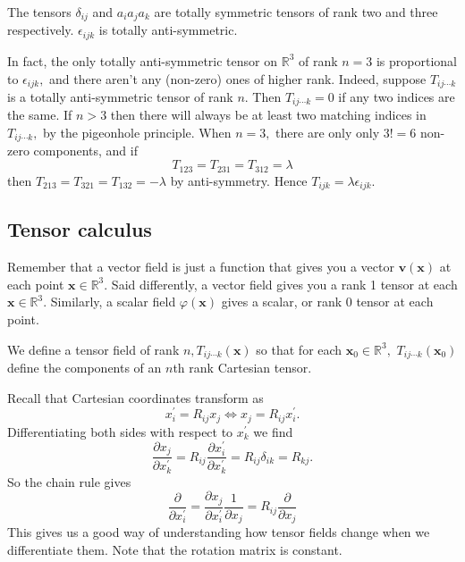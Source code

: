 \begin{example}
    The tensors $\delta_{i j}$ and $a_{i} a_{j} a_{k}$ are totally symmetric tensors of rank two and three respectively. $\epsilon_{i j k}$ is totally anti-symmetric.
\end{example}
\begin{example}
    In fact, the only totally anti-symmetric tensor on $\mathbb{R}^{3}$ of rank $n=3$ is proportional to $\epsilon_{i j k},$ and there aren't any (non-zero) ones of higher rank. 
    Indeed, suppose $T_{i j \cdots k}$ is a totally anti-symmetric tensor of rank $n$. Then $T_{i j \cdots k}=0$ if any two indices are the same. If $n>3$ then there will always be at least two matching indices in $T_{i j \cdots k},$ by the pigeonhole principle. When $n=3,$ there are only only $3 !=6$ non-zero components, and if
    \[
    T_{123}=T_{231}=T_{312}=\lambda
    \]
    then $T_{213}=T_{321}=T_{132}=-\lambda$ by anti-symmetry. Hence $T_{i j k}=\lambda \epsilon_{i j k}$.
\end{example}

\subsection{Tensor calculus}
Remember that a vector field is just a function that gives you a vector $\mathbf{v}(\mathbf{x})$ at each point $\mathbf{x} \in \mathbb{R}^{3}$. Said differently, a vector field gives you a rank 1 tensor at each $\mathbf{x} \in \mathbb{R}^{3}$. Similarly, a scalar field $\varphi(\mathbf{x})$ gives a scalar, or rank 0 tensor at each point. 
\begin{definition}
    We define a tensor field of rank $n, T_{i j \cdots k}(\mathbf{x})$ so that for each $\mathbf{x}_{0} \in \mathbb{R}^{3},$ $ T_{i j \cdots k}\left(\mathbf{x}_{0}\right)$ define the components of an $n$th rank Cartesian tensor.
\end{definition}
Recall that Cartesian coordinates transform as
\[
x_{i}^{\prime}=R_{i j} x_{j} \Longleftrightarrow x_{j}=R_{i j} x_{i}^{\prime}.
\]
Differentiating both sides with respect to $x_{k}^{\prime}$ we find
\[
\frac{\partial x_{j}}{\partial x_{k}^{\prime}}=R_{i j} \frac{\partial x_{i}^{\prime}}{\partial x_{k}^{\prime}}=R_{i j} \delta_{i k}=R_{k j}.
\]
So the chain rule gives
\[
\frac{\partial}{\partial x_{i}^{\prime}}=\frac{\partial x_{j}}{\partial x_{i}^{\prime}} \frac{1}{\partial x_{j}}=R_{i j} \frac{\partial}{\partial x_{j}}
\]
This gives us a good way of understanding how tensor fields change when we differentiate them. Note that the rotation matrix is constant.

